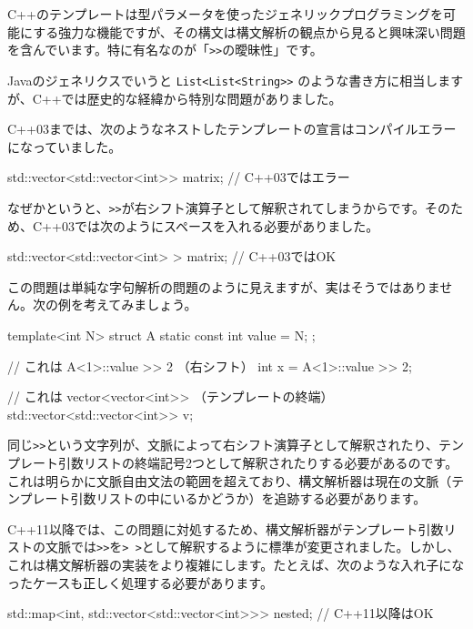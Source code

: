 C++のテンプレートは型パラメータを使ったジェネリックプログラミングを可能にする強力な機能ですが、その構文は構文解析の観点から見ると興味深い問題を含んでいます。特に有名なのが「\texttt{\textgreater{}\textgreater{}}の曖昧性」です。

Javaのジェネリクスでいうと
\texttt{List\textless{}List\textless{}String\textgreater{}\textgreater{}}
のような書き方に相当しますが、C++では歴史的な経緯から特別な問題がありました。

C++03までは、次のようなネストしたテンプレートの宣言はコンパイルエラーになっていました。

\begin{codescreen}{}
std::vector<std::vector<int>> matrix;  // C++03ではエラー
\end{codescreen}

なぜかというと、\texttt{\textgreater{}\textgreater{}}が右シフト演算子として解釈されてしまうからです。そのため、C++03では次のようにスペースを入れる必要がありました。

\begin{codescreen}{}
std::vector<std::vector<int> > matrix;  // C++03ではOK
\end{codescreen}

この問題は単純な字句解析の問題のように見えますが、実はそうではありません。次の例を考えてみましょう。

\begin{codescreen}{}
template<int N>
struct A {
    static const int value = N;
};

// これは A<1>::value >> 2 （右シフト）
int x = A<1>::value >> 2;

// これは vector<vector<int>> （テンプレートの終端）
std::vector<std::vector<int>> v;
\end{codescreen}

同じ\texttt{\textgreater{}\textgreater{}}という文字列が、文脈によって右シフト演算子として解釈されたり、テンプレート引数リストの終端記号2つとして解釈されたりする必要があるのです。これは明らかに文脈自由文法の範囲を超えており、構文解析器は現在の文脈（テンプレート引数リストの中にいるかどうか）を追跡する必要があります。

C++11以降では、この問題に対処するため、構文解析器がテンプレート引数リストの文脈では\texttt{\textgreater{}\textgreater{}}を\texttt{\textgreater{}\ \textgreater{}}として解釈するように標準が変更されました。しかし、これは構文解析器の実装をより複雑にします。たとえば、次のような入れ子になったケースも正しく処理する必要があります。

\begin{codescreen}{}
std::map<int, std::vector<std::vector<int>>> nested;  // C++11以降はOK
\end{codescreen}

